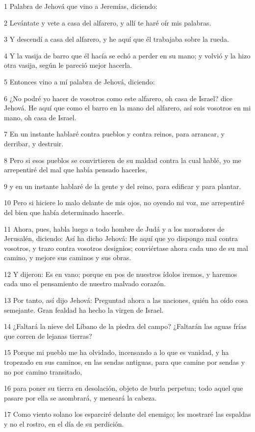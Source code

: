 \par 1 Palabra de Jehová que vino a Jeremías, diciendo:
\par 2 Levántate y vete a casa del alfarero, y allí te haré oír mis palabras.
\par 3 Y descendí a casa del alfarero, y he aquí que él trabajaba sobre la rueda.
\par 4 Y la vasija de barro que él hacía se echó a perder en su mano; y volvió y la hizo otra vasija, según le pareció mejor hacerla.
\par 5 Entonces vino a mí palabra de Jehová, diciendo:
\par 6 ¿No podré yo hacer de vosotros como este alfarero, oh casa de Israel? dice Jehová. He aquí que como el barro en la mano del alfarero, así sois vosotros en mi mano, oh casa de Israel.
\par 7 En un instante hablaré contra pueblos y contra reinos, para arrancar, y derribar, y destruir.
\par 8 Pero si esos pueblos se convirtieren de su maldad contra la cual hablé, yo me arrepentiré del mal que había pensado hacerles,
\par 9 y en un instante hablaré de la gente y del reino, para edificar y para plantar.
\par 10 Pero si hiciere lo malo delante de mis ojos, no oyendo mi voz, me arrepentiré del bien que había determinado hacerle.
\par 11 Ahora, pues, habla luego a todo hombre de Judá y a los moradores de Jerusalén, diciendo: Así ha dicho Jehová: He aquí que yo dispongo mal contra vosotros, y trazo contra vosotros designios; conviértase ahora cada uno de su mal camino, y mejore sus caminos y sus obras.
\par 12 Y dijeron: Es en vano; porque en pos de nuestros ídolos iremos, y haremos cada uno el pensamiento de nuestro malvado corazón.
\par 13 Por tanto, así dijo Jehová: Preguntad ahora a las naciones, quién ha oído cosa semejante. Gran fealdad ha hecho la virgen de Israel.
\par 14 ¿Faltará la nieve del Líbano de la piedra del campo? ¿Faltarán las aguas frías que corren de lejanas tierras? 
\par 15 Porque mi pueblo me ha olvidado, incensando a lo que es vanidad, y ha tropezado en sus caminos, en las sendas antiguas, para que camine por sendas y no por camino transitado,
\par 16 para poner su tierra en desolación, objeto de burla perpetua; todo aquel que pasare por ella se asombrará, y meneará la cabeza.
\par 17 Como viento solano los esparciré delante del enemigo; les mostraré las espaldas y no el rostro, en el día de su perdición.

